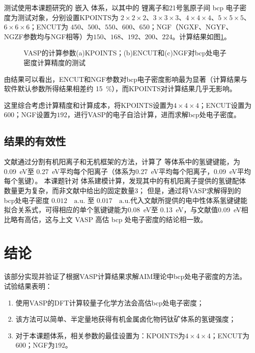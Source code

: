测试使用本课题研究的 嵌入 体系，以其中的 锂离子和21号氢原子间 bcp 电子密度为测试对象，分别设置KPOINTS为 $2 \times 2 \times 2$、$3 \times 3 \times 3$、$4 \times 4 \times 4$、$5 \times 5 \times 5$、$6 \times 6 \times 6$；ENCUT为 $450$、$500$、$550$、$600$、$650$；NGF（NGXF、NGYF、NGZF参数均与NGF相等）为$150$、$168$、$192$、$200$、$224$。计算结果如图\ref{fig:bcp-test2}。

\begin{figure}[htbp]
    \centering
    \caption{VASP的计算参数(a)KPOINTS；(b)ENCUT和(c)NGF对bcp处电子密度计算精度的测试}
    \label{fig:bcp-test2}
\end{figure}


由结果可以看出，ENCUT和NGF参数对bcp电子密度影响最为显著（计算结果与软件默认参数所得结果相差约 \SI{15}{\percent}），而KPOINTS对计算结果几乎无影响。

这里综合考虑计算精度和计算成本，将KPOINTS设置为$4 \times 4 \times 4$；ENCUT设置为$600$；NGF设置为$192$，进行VASP的电子自洽计算，进而求解bcp处电子密度。

\subsection{结果的有效性}

文献通过分割有机阳离子和无机框架的方法，计算了  等体系中的氢键键能，为 \SI{0.09}{eV}至 \SI{0.27}{eV}平均每个阳离子（体系为\SI{0.27}{eV}平均每个阳离子，\SI{0.09}{eV}平均每个氢键）。
本课题针对  体系建模计算，发现其中的有机阳离子提供的氢键配体数量更为复杂，而非文献中给出的固定数量3；
但是，通过将VASP求解得到的 bcp处电子密度 $0.012 \quad \mathrm{a.u.}$ 至 $0.017 \quad \mathrm{a.u.}$代入文献所提供的电中性体系氢键键能拟合关系式，可得相应的单个氢键键能为\SI{0.08}{eV}至 \SI{0.13}{eV}，与文献值\SI{0.09}{eV}相比略有高估，这与上文 VASP 高估 bcp 处电子密度的结论相一致。

\section{结论}

该部分实现并验证了根据VASP计算结果求解AIM理论中bcp处电子密度的方法。
试验结果表明：
\begin{enumerate}
    \item 使用VASP的DFT计算较量子化学方法会高估bcp处电子密度；
    \item 该方法可以简单、半定量地获得有机金属卤化物钙钛矿体系的氢键强度；
    \item 对于本课题体系，相关参数的最佳设置为：KPOINTS为$4 \times 4 \times 4$；ENCUT为$600$；NGF为$192$。
\end{enumerate}

